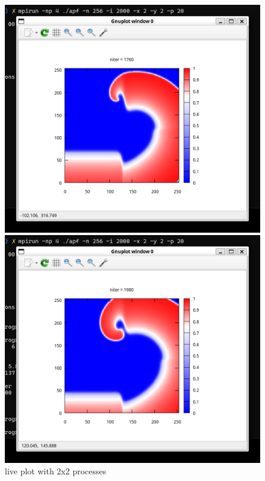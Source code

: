 \documentclass[12pt]{article}
\begin{document}
\begin{figure}[h]
\begin{minipage}[b]{0.45\textwidth}
    \end{minipage}
    \vfill
    \begin{minipage}[b]{0.45\textwidth}
        \centering
        \includegraphics[width=\textwidth]{img/3.png}
    \end{minipage}
    \hfill
    \begin{minipage}[b]{0.45\textwidth}
        \centering
        \includegraphics[width=\textwidth]{img/4.png}
    \end{minipage}
    \caption{live plot with 2x2 processes}
    \label{fig:images_grid}
\end{figure}
\end{document}
